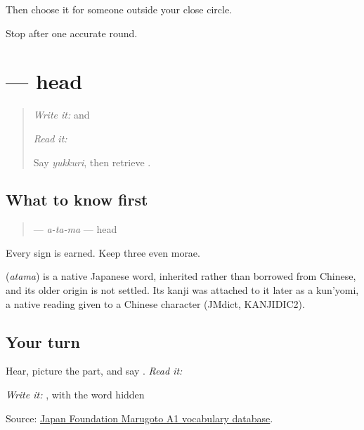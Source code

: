 Then choose it for someone outside your close circle.

\begin{tcolorbox}[breakable,colback=teal!4,colframe=teal!35!black,title={Before you move on}]
Stop after one accurate round.
\end{tcolorbox}
\section[\texorpdfstring{\ja{あたま} (atama)}{あたま (atama)}]{ — head}

\label{lesson:JA-C12-atama}



\begin{quote}
\emph{Write it:} \textbf{} and \textbf{}

\emph{Read it:} \textbf{}

Say \emph{yukkuri}, then retrieve \textbf{}.
\end{quote}

\subsection*{What to know first}
\begin{quote}
\textbf{} — \emph{a-ta-ma} — head
\end{quote}

Every sign is earned. Keep three even morae.

\begin{cousinweb}
\textbf{} (\emph{atama}) is a native Japanese word, inherited rather than borrowed from Chinese, and its older origin is not settled. Its kanji was attached to it later as a kun'yomi, a native reading given to a Chinese character (JMdict, KANJIDIC2).
\end{cousinweb}

\subsection*{Your turn}
Hear, picture the part, and say \textbf{}. \emph{Read it:} \textbf{}

\emph{Write it:} \textbf{}, with the word hidden

\begin{tcolorbox}[breakable,colback=teal!4,colframe=teal!35!black,title={Before you move on}]
Source: \href{https://words.marugotoweb.jp/}{Japan Foundation Marugoto A1 vocabulary database}.
\end{tcolorbox}
